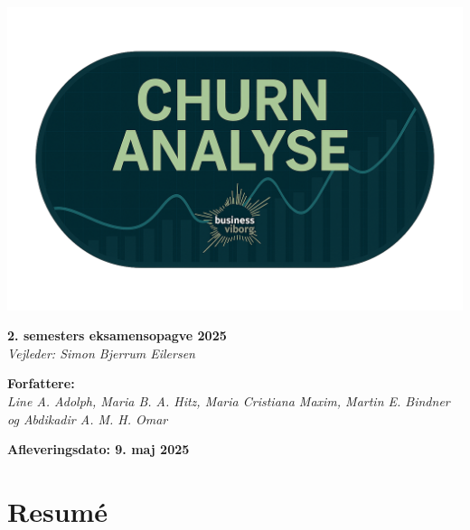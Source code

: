 \documentclass[
  11pt,
  letterpaper,
  DIV=11,
  numbers=noendperiod]{scrartcl}
\author{Line A. Adolph \and Maria B. A. Hitz \and Maria Cristiana
Maxim \and Martin E. Bindner \and Abdikadir A. M. H. Omar}
\date{2025-09-05}
\renewcommand*\contentsname{Table of contents}
\newcommand\contentsname{Table of contents}
\begin{document}
\renewcommand{\contentsname}{Indholdsfortegnelse}
\newpage

\begin{titlepage}
\begin{center}

\begin{center}
\includegraphics[width=20cm]{images/forside_logo.png}
\end{center}

\vfill

{\Large \textbf{2. semesters eksamensopagve 2025}}\\
\vspace{0cm}
\textit{Vejleder: Simon Bjerrum Eilersen}

\vfill

{\large \textbf{Forfattere:}}\\
\vspace{0cm}
\textit{Line A. Adolph, Maria B. A. Hitz, Maria Cristiana Maxim, Martin E. Bindner og Abdikadir A. M. H. Omar}

\vfill

{\large \textbf{Afleveringsdato: 9. maj 2025}}\\
\vfill
{}

\end{center}
\end{titlepage}
\newpage

\tableofcontents
\newpage

\section{Resumé}\label{resumuxe9}
\end{document}
